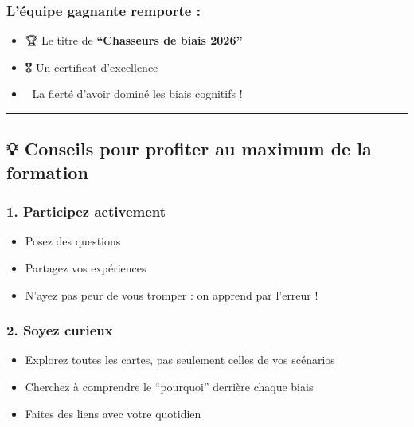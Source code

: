 \documentclass[
]{article}
\providecommand{\tightlist}{%
  \setlength{\itemsep}{0pt}\setlength{\parskip}{0pt}}
\begin{document}
\subsubsection{\texorpdfstring{\textbf{L'équipe gagnante remporte
:}}{L'équipe gagnante remporte :}}\label{luxe9quipe-gagnante-remporte}

\begin{itemize}
\tightlist
\item
  🏆 Le titre de \textbf{``Chasseurs de biais 2026''}
\item
  🎖️ Un certificat d'excellence
\item
  🧠 La fierté d'avoir dominé les biais cognitifs !
\end{itemize}

\begin{center}\rule{0.5\linewidth}{0.5pt}\end{center}

\subsection{💡 Conseils pour profiter au maximum de la
formation}\label{conseils-pour-profiter-au-maximum-de-la-formation}

\subsubsection{\texorpdfstring{\textbf{1. Participez
activement}}{1. Participez activement}}\label{participez-activement}

\begin{itemize}
\tightlist
\item
  Posez des questions
\item
  Partagez vos expériences
\item
  N'ayez pas peur de vous tromper : on apprend par l'erreur !
\end{itemize}

\subsubsection{\texorpdfstring{\textbf{2. Soyez
curieux}}{2. Soyez curieux}}\label{soyez-curieux}

\begin{itemize}
\tightlist
\item
  Explorez toutes les cartes, pas seulement celles de vos scénarios
\item
  Cherchez à comprendre le ``pourquoi'' derrière chaque biais
\item
  Faites des liens avec votre quotidien
\end{itemize}
\end{document}
